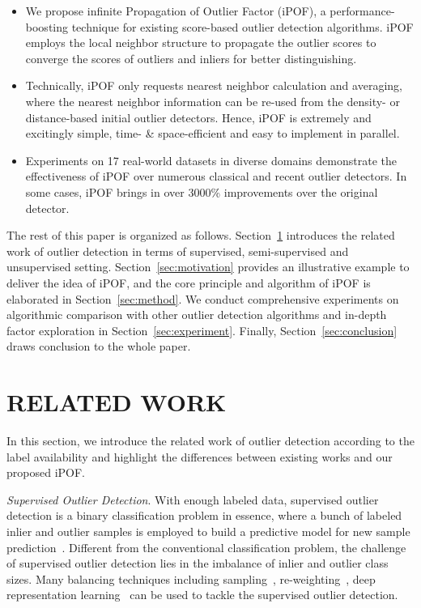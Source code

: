 \documentclass[sigconf,nonacm]{acmart}
\begin{document}
\begin{itemize}
    \item We propose infinite Propagation of Outlier Factor (iPOF), a performance-boosting technique for existing score-based outlier detection algorithms. iPOF employs the local neighbor structure to propagate the outlier scores to converge the scores of outliers and inliers for better distinguishing. 
    \item Technically, iPOF only requests nearest neighbor calculation and averaging, where the nearest neighbor information can be re-used from the density- or distance-based initial outlier detectors. Hence, iPOF is extremely and excitingly simple, time- \& space-efficient and easy to implement in parallel. 
    \item Experiments on 17 real-world datasets in diverse domains demonstrate the effectiveness of iPOF over numerous classical and recent outlier detectors. In some cases, iPOF brings in over 3000\% improvements over the original detector.
\end{itemize}

The rest of this paper is organized as follows. Section\textcolor{red}{~\ref{sec:related}} introduces the related work of outlier detection in terms of supervised, semi-supervised and unsupervised setting. Section\textcolor{red}{~\ref{sec:motivation}} provides an illustrative example to deliver the idea of iPOF, and the core principle and algorithm of iPOF is elaborated in Section\textcolor{red}{~\ref{sec:method}}. We conduct comprehensive experiments on algorithmic comparison with other outlier detection algorithms and in-depth factor exploration in Section\textcolor{red}{~\ref{sec:experiment}}. Finally, Section\textcolor{red}{~\ref{sec:conclusion}} draws conclusion to the whole paper.




\section{RELATED WORK}\label{sec:related}
In this section, we introduce the related work of outlier detection according to the label availability and highlight the differences between existing works and our proposed iPOF. 


\textit{Supervised Outlier Detection}. With enough labeled data, supervised outlier detection is a binary classification problem in essence, where a bunch of labeled inlier and outlier samples is employed to build a predictive model for new sample prediction~\textcolor{gray}{\cite{aggarwal2013outlier,gornitz2013toward,gogoi2010anomaly}}. Different from the conventional classification problem, the challenge of supervised outlier detection lies in the imbalance of inlier and outlier class sizes. Many balancing techniques including sampling~\textcolor{gray}{\cite{yang2013classification}}, re-weighting~\textcolor{gray}{\cite{ren2018learning}}, deep representation learning~\textcolor{gray}{\cite{chalapathy2019deep,kwon2017survey,li2017transferred}} can be used to tackle the supervised outlier detection.
\end{document}
